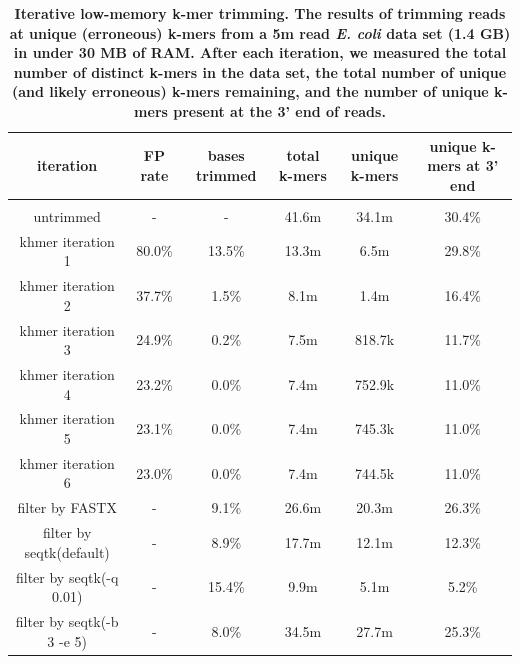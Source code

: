 \documentclass[10pt]{article}
\begin{document}
\begin{table}[!ht]
\caption{
\bf{Iterative low-memory k-mer trimming.  The results of trimming
  reads at unique (erroneous) k-mers from a 5m read {\em E. coli} data set (1.4 GB)
  in under 30 MB of RAM.  After each iteration, we measured the
  total number of distinct k-mers in the data set, the total number
  of unique (and likely erroneous) k-mers remaining, and the
  number of unique k-mers present at the 3' end of reads.}}
\begin{tabular}{ | c | c | c | c | c | c |}
iteration & FP rate & bases trimmed & total k-mers & unique k-mers & 
unique k-mers at 3' end \\
\hline \\
untrimmed                           &      -  &      - & 41.6m & 34.1m & 30.4\%  \\
khmer iteration 1                   & 80.0\%  & 13.5\% & 13.3m &  6.5m & 29.8\% \\
khmer iteration 2                   & 37.7\%  &  1.5\% &  8.1m &  1.4m & 16.4\% \\
khmer iteration 3                   & 24.9\%  &  0.2\% &  7.5m & 818.7k & 11.7\% \\
khmer iteration 4                   & 23.2\%  &  0.0\% &  7.4m & 752.9k & 11.0\% \\
khmer iteration 5                   & 23.1\%  &  0.0\% &  7.4m & 745.3k & 11.0\% \\
khmer iteration 6                   & 23.0\%  &  0.0\% &  7.4m & 744.5k & 11.0\% \\
filter by FASTX                     &      -  &  9.1\% & 26.6m & 20.3m & 26.3\% \\
filter by seqtk(default)            &      -  &  8.9\% & 17.7m & 12.1m & 12.3\% \\
filter by seqtk(-q 0.01)            &      -  & 15.4\% &  9.9m &  5.1m &  5.2\% \\
filter by seqtk(-b 3 -e 5)          &      -  &  8.0\% & 34.5m & 27.7m & 25.3\% \\
\end{tabular}
\begin{flushleft}
\end{flushleft}
\label{table:loop_trim}
\end{table}


\end{document}
